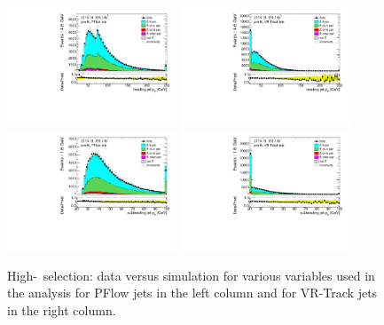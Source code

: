 \documentclass[letterpaper,12pt]{article}
\begin{document}
\begin{figure}[!h]
	\centering
	\includegraphics[width=0.45\textwidth]{FTAG_plots/pretagNoRwnewonlyPFlowall/DataMC_h_J0_pt.pdf}
	\includegraphics[width=0.45\textwidth]{FTAG_plots/pretagNoRwnewonlyVRJetsall/DataMC_h_J0_pttrackjet.pdf}\\
	\includegraphics[width=0.45\textwidth]{FTAG_plots/pretagNoRwnewonlyPFlowall/DataMC_h_J1_pt.pdf}
	\includegraphics[width=0.45\textwidth]{FTAG_plots/pretagNoRwnewonlyVRJetsall/DataMC_h_J1_pttrackjet.pdf}\\
	\caption{High-\pt\ selection: data versus simulation for various variables used in the analysis for 
	PFlow jets in the left column and for VR-Track jets in the right column.}
	\label{fig:kinematic_distributions_highpT}
\end{figure}
	
\end{document}
